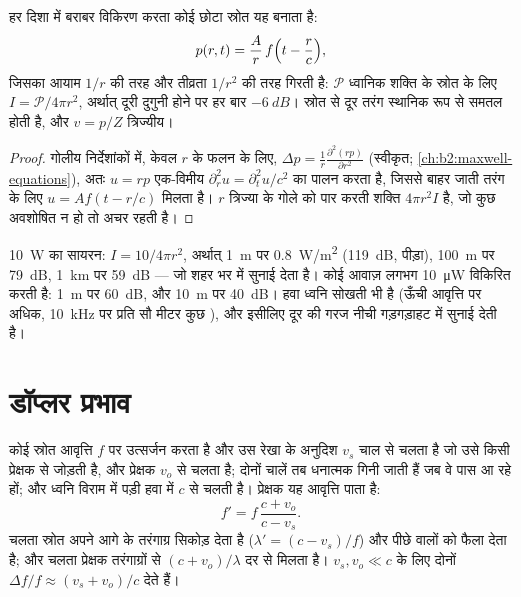 \begin{proposition}[गोलीय तरंगें और व्युत्क्रम-वर्ग नियम]\label{prop:b2:sound-waves:spherical}
हर दिशा में बराबर विकिरण करता कोई छोटा स्रोत यह 
बनाता है:
\[
p(r, t) = \frac{A}{r}\,f\Bigl(t - \frac rc\Bigr) ,
\]
जिसका आयाम $1/r$ की तरह और तीव्रता $1/r^2$ की तरह गिरती है:
$\mathcal P$ ध्वानिक शक्ति के स्रोत के लिए $I = \mathcal P/4\pi r^2$, अर्थात्
दूरी दुगुनी होने पर हर बार $-\qty{6}{dB}$। स्रोत से दूर
तरंग स्थानिक रूप से समतल होती है, और $v = p/Z$ त्रिज्यीय।
\end{proposition}

\begin{proof}
गोलीय निर्देशांकों में, केवल $r$ के फलन के लिए, $\Delta p =
\frac1r\frac{\partial^2(rp)}{\partial r^2}$ (स्वीकृत; \cref{ch:b2:maxwell-equations}),
अतः $u = rp$ एक-विमीय  $\partial_r^2u = \partial_t^2u/c^2$ का पालन करता है,
जिससे बाहर जाती तरंग के लिए $u = Af(t - r/c)$ मिलता है। $r$ त्रिज्या के
गोले को पार करती शक्ति $4\pi r^2I$ है, जो कुछ अवशोषित न हो तो अचर रहती है।
\end{proof}

\begin{example}[एक सायरन, एक बातचीत]\label{ex:b2:sound-waves:siren}
\qty{10}{W} का सायरन: $I = 10/4\pi r^2$, अर्थात् \qty{1}{m} पर \qty{0.8}{W/m^2} (\qty{119}{dB},
पीड़ा), \qty{100}{m} पर \qty{79}{dB}, \qty{1}{km} पर \qty{59}{dB} --- जो शहर भर में सुनाई देता है।
कोई आवाज़ लगभग \qty{10}{\micro W} विकिरित करती है: \qty{1}{m} पर \qty{60}{dB},
और \qty{10}{m} पर \qty{40}{dB}। हवा ध्वनि सोखती भी है (ऊँची आवृत्ति पर
अधिक, \qty{10}{kHz} पर प्रति सौ मीटर कुछ ), और इसीलिए
दूर की गरज नीची गड़गड़ाहट में सुनाई देती है।
\end{example}

\section{डॉप्लर प्रभाव}

\begin{theorem}[डॉप्लर प्रभाव]\label{thm:b2:sound-waves:doppler}
कोई स्रोत आवृत्ति $f$ पर उत्सर्जन करता है और उस रेखा के अनुदिश $v_s$ चाल
से चलता है जो उसे किसी प्रेक्षक से जोड़ती है, और प्रेक्षक $v_o$ से चलता है;
दोनों चालें तब धनात्मक गिनी जाती हैं जब वे पास आ रहे हों; और ध्वनि विराम
में पड़ी हवा में $c$ से चलती है। प्रेक्षक यह आवृत्ति पाता है:
\[
f' = f\,\frac{c + v_o}{c - v_s} .
\]
चलता स्रोत अपने आगे के तरंगाग्र सिकोड़ देता है ($\lambda' = (c - v_s)/f$)
और पीछे वालों को फैला देता है; और चलता प्रेक्षक तरंगाग्रों से
$(c + v_o)/\lambda$ दर से मिलता है। $v_s, v_o \ll c$ के लिए दोनों $\Delta f/f \approx
(v_s + v_o)/c$ देते हैं।
\end{theorem}

